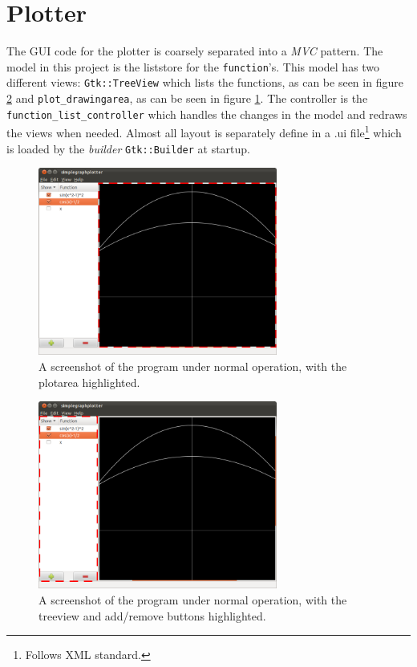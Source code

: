\documentclass[a4paper,11pt]{kth-mag}
\begin{document}
\section{Plotter}
The GUI code for the plotter is coarsely separated into a \emph{MVC} pattern. 
The model in this project is the liststore for the \texttt{function}'s. This model 
has two different views: \texttt{Gtk::TreeView} which lists the functions, as can be seen
in figure \ref{fig:screenshotfunctionlistcontroller} and
\texttt{plot\_drawingarea}, as can be seen in figure
\ref{fig:screenshotplotarea}.
The controller is the \texttt{function\_list\_controller} which handles the
changes in the model and redraws the views when needed.
Almost all layout is separately define in a .ui file\footnote{Follows XML
standard.} which is loaded by the \emph{builder} \texttt{Gtk::Builder} at startup.

\begin{figure}[H]
\begin{center}
    \includegraphics[width=0.7\textwidth]{screenshot00_plotarea.png}
    \caption{\small{A screenshot of the program under normal operation, with
    the plotarea highlighted.}}
   \label{fig:screenshotplotarea}
\end{center}
\end{figure}
\begin{figure}[H]
\begin{center}
    \includegraphics[width=0.7\textwidth]{screenshot00_function_list_controller.png}
    \caption{\small{A screenshot of the program under normal operation, with
    the treeview and add/remove buttons highlighted.}}
   \label{fig:screenshotfunctionlistcontroller}
\end{center}
\end{figure}
\end{document}
